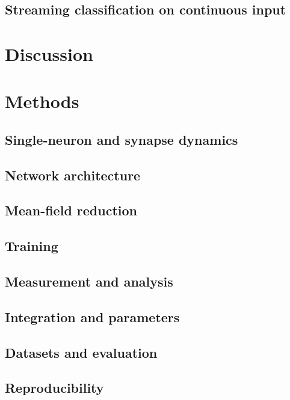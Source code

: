 \documentclass{article}
\begin{document}
\subsection{Streaming classification on continuous input}
\label{claim:7}

\section{Discussion}

\section{Methods}

\subsection{Single-neuron and synapse dynamics}

\subsection{Network architecture}

\subsection{Mean-field reduction}

\subsection{Training}

\subsection{Measurement and analysis}

\subsection{Integration and parameters}

\subsection{Datasets and evaluation}

\subsection{Reproducibility}
\end{document}
